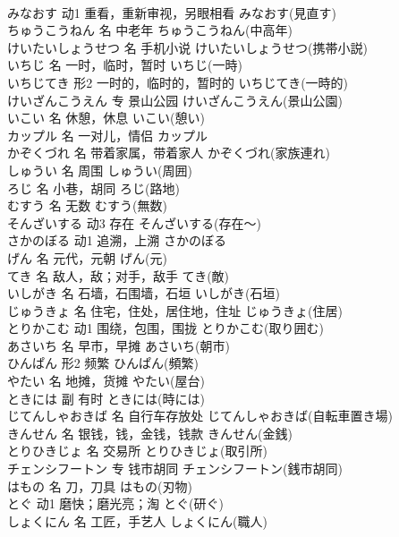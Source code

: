 \documentclass[8pt]{extreport}
\begin{document}
\begin{CJK}{UTF8}{min}
\\	みなおす	动1	重看，重新审视，另眼相看	みなおす(見直す)	
\\	ちゅうこうねん	名	中老年	ちゅうこうねん(中高年)	
\\	けいたいしょうせつ	名	手机小说	けいたいしょうせつ(携帯小説)	
\\	いちじ	名	一时，临时，暂时	いちじ(一時)	
\\	いちじてき	形2	一时的，临时的，暂时的	いちじてき(一時的)	
\\	けいざんこうえん	专	景山公园	けいざんこうえん(景山公園)	
\\	いこい	名	休憩，休息	いこい(憩い)	
\\	カップル	名	一对儿，情侣	カップル	
\\	かぞくづれ	名	带着家属，带着家人	かぞくづれ(家族連れ)	
\\	しゅうい	名	周围	しゅうい(周囲)	
\\	ろじ	名	小巷，胡同	ろじ(路地)	
\\	むすう	名	无数	むすう(無数)	
\\	そんざいする	动3	存在	そんざいする(存在～)	
\\	さかのぼる	动1	追溯，上溯	さかのぼる	
\\	げん	名	元代，元朝	げん(元)	
\\	てき	名	敌人，敌；对手，敌手	てき(敵)	
\\	いしがき	名	石墙，石围墙，石垣	いしがき(石垣)	
\\	じゅうきょ	名	住宅，住处，居住地，住址	じゅうきょ(住居)	
\\	とりかこむ	动1	围绕，包围，围拢	とりかこむ(取り囲む)	
\\	あさいち	名	早市，早摊	あさいち(朝市)	
\\	ひんぱん	形2	频繁	ひんぱん(頻繁)	
\\	やたい	名	地摊，货摊	やたい(屋台)	
\\	ときには	副	有时	ときには(時には)	
\\	じてんしゃおきば	名	自行车存放处	じてんしゃおきば(自転車置き場)	
\\	きんせん	名	银钱，钱，金钱，钱款	きんせん(金銭)	
\\	とりひきじょ	名	交易所	とりひきじょ(取引所)	
\\	チェンシフートン	专	钱市胡同	チェンシフートン(銭市胡同)	
\\	はもの	名	刀，刀具	はもの(刃物)	
\\	とぐ	动1	磨快；磨光亮；淘	とぐ(研ぐ)	
\\	しょくにん	名	工匠，手艺人	しょくにん(職人)	

\end{CJK}
\end{document}
